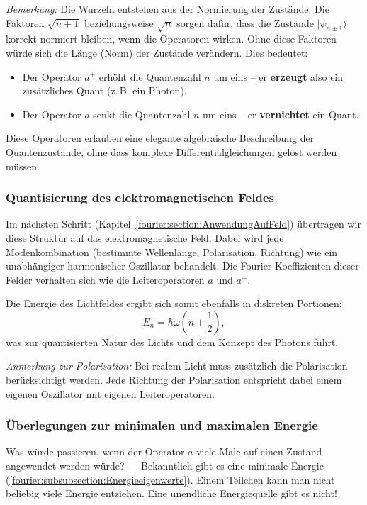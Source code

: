 			\textit{Bemerkung:} 
			Die Wurzeln entstehen aus der Normierung der Zustände.
			Die Faktoren $\sqrt{n+1}$ beziehungsweise $\sqrt{n}$ sorgen dafür, dass die Zustände $|\psi_{n\pm1}\rangle$ korrekt normiert bleiben, wenn die Operatoren wirken.
			Ohne diese Faktoren würde sich die Länge (Norm) der Zustände verändern.
			Dies bedeutet:
			\begin{itemize}
				\item Der Operator $a^+$ erhöht die Quantenzahl $n$ um eins – er \textbf{erzeugt} also ein zusätzliches Quant (z.\,B. ein Photon).
				\item Der Operator $a$ senkt die Quantenzahl $n$ um eins – er \textbf{vernichtet} ein Quant.
			\end{itemize}

			Diese Operatoren erlauben eine elegante algebraische Beschreibung der Quantenzustände, ohne dass komplexe Differentialgleichungen gelöst werden müssen.

		\subsubsection{Quantisierung des elektromagnetischen Feldes\label{fourier:subsubsection:QuantisierungElmagFeld}}
			Im nächsten Schritt (Kapitel~\ref{fourier:section:AnwendungAufFeld}) übertragen wir diese Struktur auf das elektromagnetische Feld.
			Dabei wird jede Modenkombination (bestimmte Wellenlänge, Polarisation, Richtung) wie ein unabhängiger harmonischer Oszillator behandelt.
			Die Fourier-Koeffizienten dieser Felder verhalten sich wie die Leiteroperatoren $a$ und $a^+$.

			Die Energie des Lichtfeldes ergibt sich somit ebenfalls in diskreten Portionen:
			\[
				E_n = \hbar\omega\left(n + \frac{1}{2}\right),
			\]
			was zur quantisierten Natur des Lichts und dem Konzept des Photons führt.

			\textit{Anmerkung zur Polarisation:} Bei realem Licht muss zusätzlich die Polarisation berücksichtigt werden.
			Jede Richtung der Polarisation entspricht dabei einem eigenen Oszillator mit eigenen Leiteroperatoren.

		\subsubsection{Überlegungen zur minimalen und maximalen Energie\label{fourier:subsubsection:MinMaxEnergie}}
			Was würde passieren, wenn der Operator $a$ viele Male auf einen Zustand angewendet werden würde? ---
			Bekanntlich gibt es eine minimale Energie (\ref{fourier:subsubsection:Energieeigenwerte}).
			Einem Teilchen kann man nicht beliebig viele Energie entziehen.
			Eine unendliche Energiequelle gibt es nicht!

